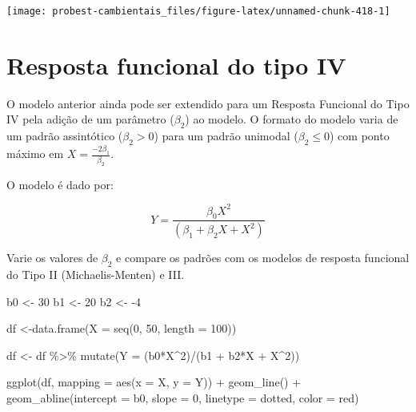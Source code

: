 \documentclass[
]{book}
\newenvironment{Shaded}{\begin{snugshade}}{\end{snugshade}}
\newcommand{\AttributeTok}[1]{\textcolor[rgb]{0.77,0.63,0.00}{#1}}
\newcommand{\DecValTok}[1]{\textcolor[rgb]{0.00,0.00,0.81}{#1}}
\newcommand{\FunctionTok}[1]{\textcolor[rgb]{0.00,0.00,0.00}{#1}}
\newcommand{\NormalTok}[1]{#1}
\newcommand{\OtherTok}[1]{\textcolor[rgb]{0.56,0.35,0.01}{#1}}
\newcommand{\SpecialCharTok}[1]{\textcolor[rgb]{0.00,0.00,0.00}{#1}}
\newcommand{\StringTok}[1]{\textcolor[rgb]{0.31,0.60,0.02}{#1}}
\begin{document}
\begin{center}\texttt{[image: probest-cambientais\_files/figure-latex/unnamed-chunk-418-1]} \end{center}

\hypertarget{resposta-funcional-do-tipo-iv}{%
\section{Resposta funcional do tipo IV}\label{resposta-funcional-do-tipo-iv}}

O modelo anterior ainda pode ser extendido para um Resposta Funcional do Tipo IV pela adição de um parâmetro (\(\beta_2\)) ao modelo. O formato do modelo varia de um padrão assintótico (\(\beta_2 > 0\)) para um padrão unimodal (\(\beta_2 \le 0\)) com ponto máximo em \(X = \frac{-2\beta_1}{\beta_2}\).

O modelo é dado por:

\[Y = \frac{\beta_0 X^2}{(\beta_1 + \beta_2 X + X^2)}\]

Varie os valores de \(\beta_2\) e compare os padrões com os modelos de resposta funcional do Tipo II (Michaelis-Menten) e III.

\begin{Shaded}
\begin{Highlighting}[]
\NormalTok{b0 }\OtherTok{\textless{}{-}} \DecValTok{30}
\NormalTok{b1 }\OtherTok{\textless{}{-}} \DecValTok{20}
\NormalTok{b2 }\OtherTok{\textless{}{-}} \SpecialCharTok{{-}}\DecValTok{4}

\NormalTok{df }\OtherTok{\textless{}{-}}\FunctionTok{data.frame}\NormalTok{(}\AttributeTok{X =} \FunctionTok{seq}\NormalTok{(}\DecValTok{0}\NormalTok{, }\DecValTok{50}\NormalTok{, }\AttributeTok{length =} \DecValTok{100}\NormalTok{))}

\NormalTok{df }\OtherTok{\textless{}{-}}\NormalTok{ df }\SpecialCharTok{\%\textgreater{}\%} \FunctionTok{mutate}\NormalTok{(}\AttributeTok{Y =}\NormalTok{ (b0}\SpecialCharTok{*}\NormalTok{X}\SpecialCharTok{\^{}}\DecValTok{2}\NormalTok{)}\SpecialCharTok{/}\NormalTok{(b1 }\SpecialCharTok{+}\NormalTok{ b2}\SpecialCharTok{*}\NormalTok{X }\SpecialCharTok{+}\NormalTok{ X}\SpecialCharTok{\^{}}\DecValTok{2}\NormalTok{))}

\FunctionTok{ggplot}\NormalTok{(df, }\AttributeTok{mapping =} \FunctionTok{aes}\NormalTok{(}\AttributeTok{x =}\NormalTok{ X, }\AttributeTok{y =}\NormalTok{ Y)) }\SpecialCharTok{+}
  \FunctionTok{geom\_line}\NormalTok{() }\SpecialCharTok{+}
  \FunctionTok{geom\_abline}\NormalTok{(}\AttributeTok{intercept =}\NormalTok{ b0, }\AttributeTok{slope =} \DecValTok{0}\NormalTok{, }\AttributeTok{linetype =} \StringTok{\textquotesingle{}dotted\textquotesingle{}}\NormalTok{, }\AttributeTok{color =} \StringTok{\textquotesingle{}red\textquotesingle{}}\NormalTok{)}
\end{Highlighting}
\end{Shaded}
\end{document}
